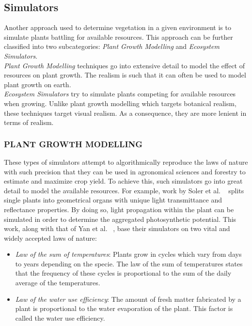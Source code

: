 \subsection{Simulators} \label{Simulators}

Another approach used to determine vegetation in a given environment is to simulate plants battling for available resources. This approach can be further classified into two subcategories: \textit{Plant Growth Modelling} and \textit{Ecosystem Simulators}.\\
\textit{Plant Growth Modelling} techniques go into extensive detail to model the effect of resources on plant growth. The realism is such that it can often be used to model plant growth on earth. \\
\textit{Ecosystem Simulators} try to simulate plants competing for available resources when growing. Unlike plant growth modelling which targets botanical realism, these techniques target visual realism. As a consequence, they are more lenient in terms of realism.

\subsubsection{PLANT GROWTH MODELLING}

These types of simulators attempt to algorithmically reproduce the laws of nature with such precision that they can be used in agronomical sciences and forestry to estimate and maximize crop yield. To achieve this, such simulators go into great detail to model the available resources. For example,  work by Soler et al. ~\cite{Soler2001,Soler2003} splits single plants into geometrical organs with unique light transmittance and reflectance properties. By doing so, light propagation within the plant can be simulated in order to determine the aggregated photosynthetic potential. This work, along with that of Yan et al. ~\cite{Yan2004}, base their simulators on two vital and widely accepted laws of nature:
\begin{itemize}
\item \textit{Law of the sum of temperatures}: Plants grow in cycles which vary from days to years depending on the specie. The law of the sum of temperatures states that the frequency of these cycles is proportional to the sum of the daily average of the temperatures.
\item \textit{Law of the water use efficiency}: The amount of fresh matter fabricated by a plant is proportional to the water evaporation of the plant. This factor is called the water use efficiency. 
\end{itemize}

